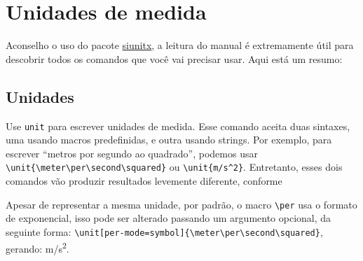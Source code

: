 \section{Unidades de medida}

Aconselho o uso do pacote \href{https://ctan.org/pkg/siunitx}{siunitx}, a leitura do manual é extremamente útil para descobrir todos os comandos que você vai precisar usar. Aqui está um resumo:

\subsection{Unidades}

Use \texttt{unit} para escrever unidades de medida. Esse comando aceita duas sintaxes, uma usando macros predefinidas, e outra usando strings. Por exemplo, para escrever \enquote{metros por segundo ao quadrado}, podemos usar \verb|\unit{\meter\per\second\squared}| ou \verb|\unit{m/s^2}|. Entretanto, esses dois comandos vão produzir resultados levemente diferente, conforme

\begin{table}[htb]
  \begin{center}
  \end{center}
\end{table}

Apesar de representar a mesma unidade, por padrão, o macro  \verb|\per| usa o formato de exponencial, isso pode ser alterado passando um argumento opcional, da seguinte forma: \verb|\unit[per-mode=symbol]{\meter\per\second\squared}|, gerando: \unit[per-mode=symbol]{\meter\per\second\squared}.

